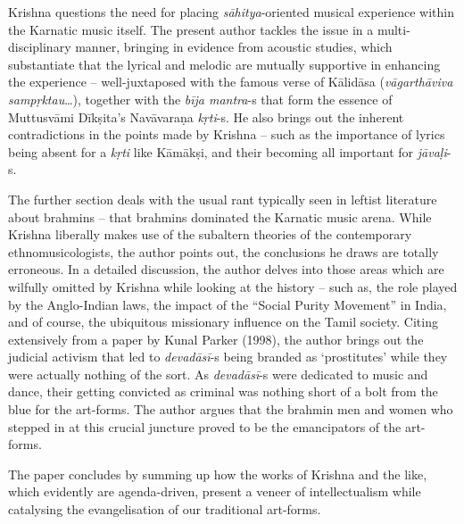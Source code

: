Krishna questions the need for placing \textit{sāhitya}-oriented musical experience within the Karnatic music itself. The present author tackles the issue in a multi-disciplinary manner, bringing in evidence from acoustic studies, which substantiate that the lyrical and melodic are mutually supportive in enhancing the experience – well-juxtaposed with the famous verse of Kālidāsa (\textit{vāgarthāviva sampṛktau}…), together with the \textit{bīja mantra}-s that form the essence of Muttusvāmi Dīkṣita’s Navāvaraṇa \textit{kṛti}-s. He also brings out the inherent contradictions in the points made by Krishna – such as the importance of lyrics being absent for a \textit{kṛti} like Kāmākṣi, and their becoming all important for \textit{jāvaḷi}-s.

The further section deals with the usual rant typically seen in leftist literature about brahmins – that brahmins dominated the Karnatic music arena. While Krishna liberally makes use of the subaltern theories of the contemporary ethnomusicologists, the author points out, the conclusions he draws are totally erroneous. In a detailed discussion, the author delves into those areas which are wilfully omitted by Krishna while looking at the history – such as, the role played by the Anglo-Indian laws, the impact of the “Social Purity Movement” in India, and of course, the ubiquitous missionary influence on the Tamil society. Citing extensively from a paper by Kunal Parker (1998), the author brings out the judicial activism that led to \textit{devadāsī}-s being branded as ‘prostitutes’ while they were actually nothing of the sort. As \textit{devadāsī}-s were dedicated to music and dance, their getting convicted as criminal was nothing short of a bolt from the blue for the art-forms. The author argues that the brahmin men and women who stepped in at this crucial juncture proved to be the emancipators of the art-forms.

The paper concludes by summing up how the works of Krishna and the like, which evidently are agenda-driven, present a veneer of intellectualism while catalysing the evangelisation of our traditional art-forms.


